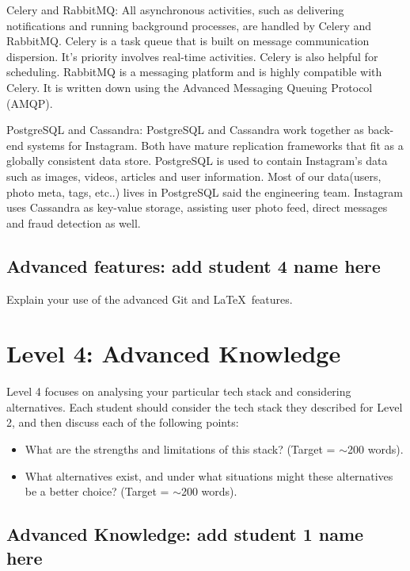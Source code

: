 \documentclass[a4paper, 11pt]{report}
\begin{document}
 Celery and RabbitMQ: All asynchronous activities, such as delivering notifications and running background processes, are handled by Celery and RabbitMQ. Celery is a task queue that is built on message communication dispersion. It's priority involves real-time activities. Celery is also helpful for scheduling. RabbitMQ is a messaging platform and is highly compatible with Celery. It is written down using the Advanced Messaging Queuing Protocol (AMQP).

PostgreSQL and Cassandra: PostgreSQL and Cassandra work together as back-end systems for Instagram. Both have mature replication frameworks that fit as a globally consistent data store. PostgreSQL is used to contain Instagram's data such as images, videos, articles and user information. Most of our data(users, photo meta, tags, etc..) lives in PostgreSQL said the engineering team. Instagram uses Cassandra as key-value storage, assisting user photo feed, direct messages and fraud detection as well.


\subsection{Advanced features: add student 4 name here}

Explain your use of the advanced Git and \LaTeX\ features. 




\newpage
\section{Level 4: Advanced Knowledge}

Level 4 focuses on analysing your particular tech stack and considering alternatives. Each student should consider the tech stack they described for Level 2, and then discuss each of the following points:
\begin{itemize}
    \item What are the strengths and limitations of this stack? (Target = $\sim$200 words).
    \item What alternatives exist, and under what situations might these alternatives be a better choice? (Target = $\sim$200 words).
\end{itemize}

\subsection{Advanced Knowledge: add student 1 name here}
\end{document}
